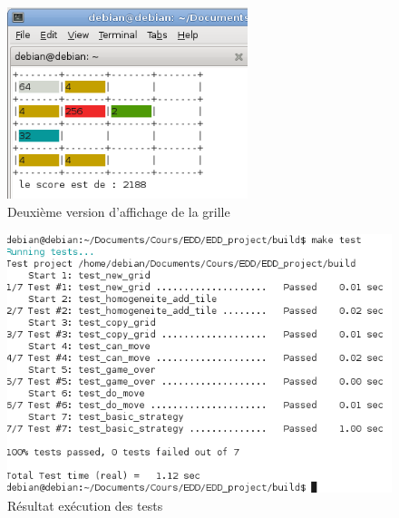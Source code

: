 \documentclass[12pt]{article}
\begin{document}
\begin{figure}
   \caption{\label{grille_couleur} Deuxi\`eme version d'affichage de la grille}
   \includegraphics[width=7cm]{grille_couleur.png}
\end{figure}

\begin{figure}
   \caption{\label{test} R\'esultat ex\'ecution des tests}
   \includegraphics[scale=0.6]{test.png}
\end{figure}
\end{document}
